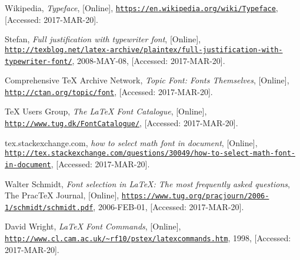 \documentclass[a4paper,oneside,11pt]{article}
\begin{document}
\begin{thebibliography}{1}
        
        Wikipedia,
        \emph{Typeface},
        [Online],
        \href{https://en.wikipedia.org/wiki/Typeface}
             {\nolinkurl{https://en.wikipedia.org/wiki/Typeface}},
        [Accessed: 2017-MAR-20].

        Stefan,
        \emph{Full justification with typewriter font},
        [Online],
        \href{http://texblog.net/latex-archive/plaintex/full-justification-with-typewriter-font/}
             {\nolinkurl{http://texblog.net/latex-archive/plaintex/full-justification-with-typewriter-font/}},
        2008-MAY-08,
        [Accessed: 2017-MAR-20].

        Comprehensive \TeX{} Archive Network,
        \emph{Topic Font: Fonts Themselves},
        [Online],
        \href{http://ctan.org/topic/font}
             {\nolinkurl{http://ctan.org/topic/font}},
        [Accessed: 2017-MAR-20].

        \TeX{} Users Group,
        \emph{The \LaTeX{} Font Catalogue},
        [Online],
        \href{http://www.tug.dk/FontCatalogue/}
             {\nolinkurl{http://www.tug.dk/FontCatalogue/}},
        [Accessed: 2017-MAR-20].

        tex.stackexchange.com,
        \emph{how to select math font in document},
        [Online],
        \href{http://tex.stackexchange.com/questions/30049/how-to-select-math-font-in-document}
             {\nolinkurl{http://tex.stackexchange.com/questions/30049/how-to-select-math-font-in-document}},
        [Accessed: 2017-MAR-20].
        
        Walter Schmidt,
        \emph{Font selection in \LaTeX{}: The most frequently asked questions},
        The Prac\TeX{} Journal,
        [Online],
        \href{https://www.tug.org/pracjourn/2006-1/schmidt/schmidt.pdf}
             {\nolinkurl{https://www.tug.org/pracjourn/2006-1/schmidt/schmidt.pdf}},
        2006-FEB-01,
        [Accessed: 2017-MAR-20].

        David Wright,
        \emph{\LaTeX{} Font Commands},
        [Online],
        \href{http://www.cl.cam.ac.uk/~rf10/pstex/latexcommands.htm}
             {\nolinkurl{http://www.cl.cam.ac.uk/~rf10/pstex/latexcommands.htm}},
        1998,
        [Accessed: 2017-MAR-20].

\end{thebibliography}
\end{document}
